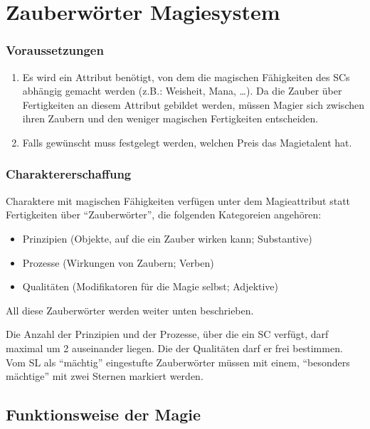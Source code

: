 \section{Zauberwörter Magiesystem}
\subsubsection{Voraussetzungen}
\begin{enumerate}
\item Es wird ein Attribut benötigt, von dem die magischen Fähigkeiten des SCs abhängig gemacht werden (z.B.: Weisheit, Mana, \dots). Da die Zauber über Fertigkeiten an diesem Attribut gebildet werden, müssen Magier sich zwischen ihren Zaubern und den weniger magischen Fertigkeiten entscheiden.
\item Falls gewünscht muss festgelegt werden, welchen Preis das Magietalent hat.
\end{enumerate}
\subsubsection{Charaktererschaffung}

Charaktere mit magischen Fähigkeiten verfügen unter dem Magieattribut statt Fertigkeiten über "`Zauberwörter"', die folgenden Kategoreien angehören:
\begin{itemize}
\item Prinzipien (Objekte, auf die ein Zauber wirken kann; Substantive)
\item Prozesse (Wirkungen von Zaubern; Verben)
\item Qualitäten (Modifikatoren für die Magie selbst; Adjektive)
\end{itemize}
All diese Zauberwörter werden weiter unten beschrieben.

Die Anzahl der Prinzipien und der Prozesse, über die ein SC verfügt, darf maximal um 2 auseinander liegen. Die der Qualitäten darf er frei bestimmen. Vom SL als "`mächtig"' eingestufte Zauberwörter müssen mit einem, "`besonders mächtige"' mit zwei Sternen markiert werden.

\subsection{Funktionsweise der Magie}


